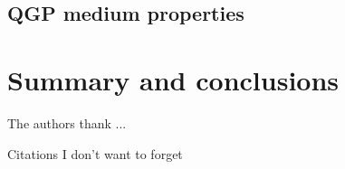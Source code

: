 \documentclass[aps,prc,reprint,amsmath,nofootinbib]{revtex4-1}
\def\\#1{ #1}
\begin{document}
%
%

\subsection{QGP medium properties}


\section{Summary and conclusions}


\begin{acknowledgments}
  The authors thank ...
\end{acknowledgments}

Citations I don't want to forget \cite{Shen:2016mmv}

\end{document}
